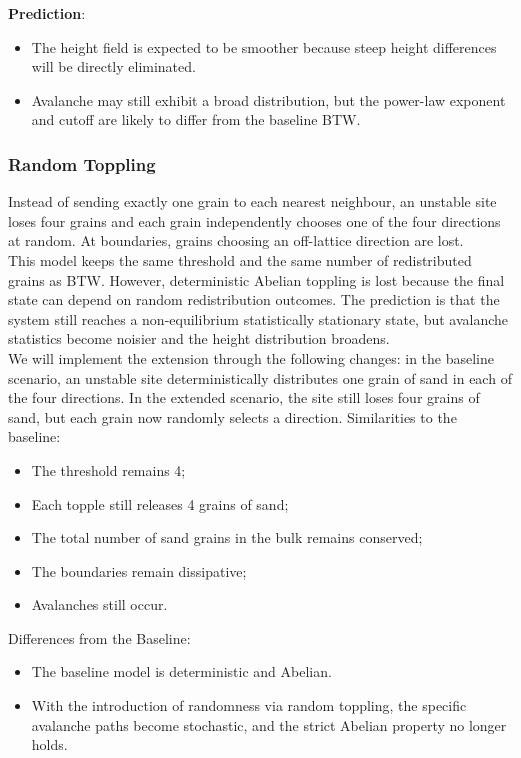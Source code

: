 \documentclass{article}
\begin{document}
\textbf{Prediction}:
\begin{itemize}
    \item The height field is expected to be smoother because steep height differences will be directly eliminated.
    
    \item Avalanche may still exhibit a broad distribution, but the power-law exponent and cutoff are likely to differ from the baseline BTW.
\end{itemize}

\subsubsection{Random Toppling}
Instead of sending exactly one grain to each nearest neighbour, an unstable site loses four grains and each grain independently chooses one of the four directions at random. At boundaries, grains choosing an off-lattice direction are lost.\\

This model keeps the same threshold and the same number of redistributed grains as BTW. However, deterministic Abelian toppling is lost because the final state can depend on random redistribution outcomes. The prediction is that the system still reaches a non-equilibrium statistically stationary state, but avalanche statistics become noisier and the height distribution broadens.\\

We will implement the extension through the following changes: in the baseline scenario, an unstable site deterministically distributes one grain of sand in each of the four directions. In the extended scenario, the site still loses four grains of sand, but each grain now randomly selects a direction. Similarities to the baseline: 

\begin{itemize}
    \item The threshold remains 4;
    \item Each topple still releases 4 grains of sand;
    \item The total number of sand grains in the bulk remains conserved;
    \item The boundaries remain dissipative;
    \item Avalanches still occur.
\end{itemize}

Differences from the Baseline:

\begin{itemize}
    \item The baseline model is deterministic and Abelian.
    
    \item With the introduction of randomness via random toppling, the specific avalanche paths become stochastic, and the strict Abelian property no longer holds.
\end{itemize}
\end{document}

